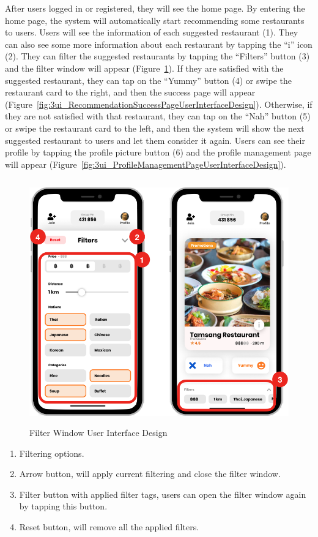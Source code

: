 \documentclass[12pt,oneside,openright,a4paper]{cpe-english-project}
\begin{document}
After users logged in or registered, they will see the home page. By entering the home page, the system will automatically start recommending some restaurants to users. Users will see the information of each suggested restaurant (1). They can also see some more information about each restaurant by tapping the “i” icon (2). They can filter the suggested restaurants by tapping the “Filters” button (3) and the filter window will appear (Figure~\ref{fig:3ui_FilterWindowUserInterfaceDesign}). If they are satisfied with the suggested restaurant, they can tap on the “Yummy” button (4) or swipe the restaurant card to the right, and then the success page will appear (Figure~\ref{fig:3ui_RecommendationSuccessPageUserInterfaceDesign}). Otherwise, if they are not satisfied with that restaurant, they can tap on the “Nah” button (5) or swipe the restaurant card to the left, and then the system will show the next suggested restaurant to users and let them consider it again. Users can see their profile by tapping the profile picture button (6) and the profile management page will appear (Figure~\ref{fig:3ui_ProfileManagementPageUserInterfaceDesign}).

\newpage
\begin{figure}[H]\centering
\includegraphics[height=300pt]{./images/3ui_FilterWindowUserInterfaceDesign.png}
\caption{Filter Window User Interface Design}\label{fig:3ui_FilterWindowUserInterfaceDesign}
\end{figure}\vspace{-24pt}

\begin{enumerate}
\item Filtering options.
\item Arrow button, will apply current filtering and close the filter window.
\item Filter button with applied filter tags, users can open the filter window again by tapping this button.
\item Reset button, will remove all the applied filters.
\end{enumerate}
\end{document}
